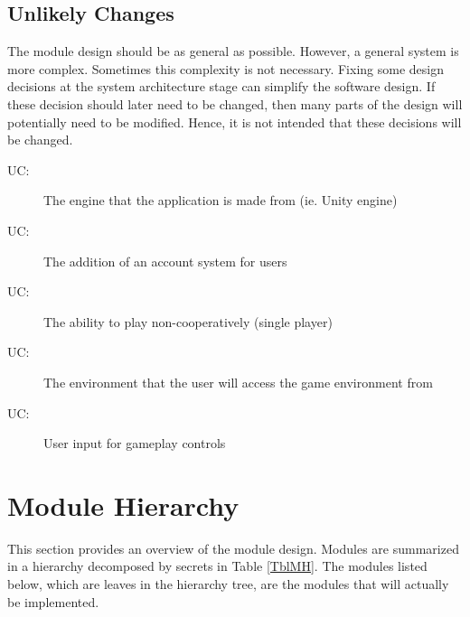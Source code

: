 \documentclass[12pt, titlepage]{article}
\newcounter{ucnum}
\newcommand{\uctheucnum}{UC\theucnum}
\begin{document}
\subsection{Unlikely Changes} \label{SecUchange}

The module design should be as general as possible. However, a general system is
more complex. Sometimes this complexity is not necessary. Fixing some design
decisions at the system architecture stage can simplify the software design. If
these decision should later need to be changed, then many parts of the design
will potentially need to be modified. Hence, it is not intended that these
decisions will be changed.

\begin{description}
\item[ \uctheucnum \label{ucIO}:] The engine that the application is made from (ie. Unity engine)
\item[ \uctheucnum \label{ucIO}:] The addition of an account system for users
\item[ \uctheucnum \label{ucIO}:] The ability to play non-cooperatively (single player)
\item[ \uctheucnum \label{ucIO}:] The environment that the user will access the game environment from
\item[ \uctheucnum \label{ucIO}:] User input for gameplay controls
\end{description}

\section{Module Hierarchy} \label{SecMH}

This section provides an overview of the module design. Modules are summarized
in a hierarchy decomposed by secrets in Table \ref{TblMH}. The modules listed
below, which are leaves in the hierarchy tree, are the modules that will
actually be implemented.
\end{document}
